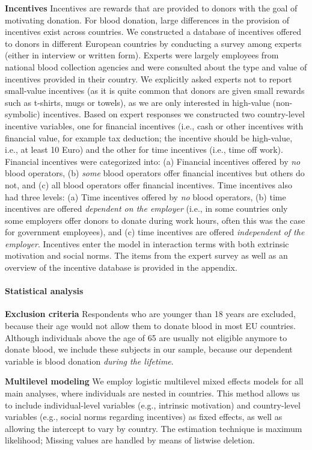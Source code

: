 \documentclass[AER]{AEA}
\begin{document}
\textbf{Incentives} Incentives are rewards that are provided to donors with the goal of motivating donation.  For blood donation, large differences in the provision of incentives exist across countries. We constructed a database of incentives offered to donors in different European countries by conducting a survey among experts (either in interview or written form). Experts were largely employees from national blood collection agencies and were consulted about the type and value of incentives provided in their country. We explicitly asked experts not to report small-value incentives (as it is quite common that donors are given small rewards such as t-shirts, mugs or towels), as we are only interested in high-value (non-symbolic) incentives. Based on expert responses we constructed two country-level incentive variables, one for financial incentives (i.e., cash or other incentives with financial value, for example tax deduction; the incentive should be high-value, i.e., at least 10 Euro) and the other for time incentives (i.e., time off work). Financial incentives were categorized into: (a) Financial incentives offered by \textit{no} blood operators, (b) \textit{some} blood operators offer financial incentives but others do not, and (c) all blood operators offer financial incentives. Time incentives also had three levels: (a) Time incentives offered by \textit{no} blood operators, (b) time incentives are offered \textit{dependent on the employer} (i.e., in some countries only some employers offer donors to donate during work hours, often this was the case for government employees), and (c) time incentives are offered \textit{independent of the employer}. Incentives enter the model in interaction terms with both extrinsic motivation and social norms. The items from the expert survey as well as an overview of the incentive database is provided in the appendix.


\paragraph{Statistical analysis}

\textbf{Exclusion criteria} Respondents who are younger than 18 years are excluded, because their age would not allow them to donate blood in most EU countries. Although individuals above the age of 65 are usually not eligible anymore to donate blood, we include these subjects in our sample, because our dependent variable is blood donation \textit{during the lifetime}. 

\textbf{Multilevel modeling} We employ logistic multilevel mixed effects models for all main analyses, where individuals are nested in countries. This method allows us to include individual-level variables (e.g., intrinsic motivation) and country-level variables (e.g., social norms regarding incentives) as fixed effects, as well as allowing the intercept to vary by country. The estimation technique is maximum likelihood; Missing values are handled by means of listwise deletion. 
\end{document}
